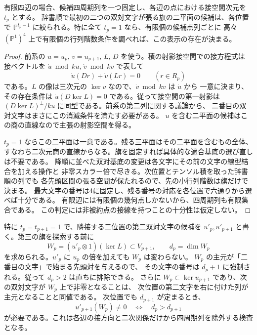 \begin{corollary}\label{cor:pbw-tangent-flags}
有限四辺の場合、候補四周期列を一つ固定し、各辺の点における接空間次元を $t_p$ とする。
辞書順で最初の二つの双対文字が張る旗の二平面の候補は、各位置で
$\mathbb P^{t_p-1}$ に絞られる。特に全て $t_p=1$ なら、有限個の候補点列ごとに
高々 $(\mathbb P^1)^4$ 上で有限個の行列階数条件を調べれば、この表示の存在が決まる。
\end{corollary}
\begin{proof}
前系の $u=u_p$, $v=u_{p+1}$, $L$, $D$ を使う。積の射影接空間での接方程式は
接ベクトルを $\dot u\bmod ku$, $\dot v\bmod kv$ で表して
\[
             \dot u(D r)+\dot v(L r)=0\qquad(r\in R_p)
\]
である。$L$ の像は三次元の $\ker v$ なので、$\dot v\bmod kv$ は $\dot u$ から
一意に決まり、その存在条件は $\dot u(D\ker L)=0$ である。従って接空間の第一射影は
$(D\ker L)^\perp/ku$ に同型である。前系の第二列に関する議論から、
二番目の双対文字はまさにこの消滅条件を満たす必要がある。
$u$ を含む二平面の候補はこの商の直線なので主張の射影空間を得る。

$t_p=1$ ならこの二平面は一意である。残る三平面はその二平面を含むもの全体、
すなわち二次元商の直線からなる。旗を固定すれば具体的な適合基底の選び直しは不要である。
降順に並べた双対基底の変更は各文字にその前の文字の線型結合を加える操作と
非零スカラー倍で尽きる。次位置とテンソル積を取った辞書順の列でも
各先頭区間の張る空間が保たれるので、先の小行列階数は旗だけで決まる。
最大文字の番号は4に固定し、残る番号の対応を各位置で六通りから選べば十分である。
有限辺には有限個の幾何点しかないから、四周期列も有限集合である。
この判定には非被約点の接線を持つことの十分性は仮定しない。
\end{proof}

特に $t_p=t_{p+1}=1$ で、隣接する二位置の第二双対文字の候補を
$u'_p,u'_{p+1}$ と書く。第三の旗を探索する前に
\[
 W_p=(u'_p\otimes1)(\ker L)\subset V_{p+1},\qquad d_p=\dim W_p
\]
を求められる。$u'_p$ に $u_p$ の倍を加えても $W_p$ は変わらない。
$W_p$ の主元が「二番目の文字」で始まる先頭対を与えるので、
その文字の番号は $d_p+1$ に強制される。従って $d_p>2$ は直ちに排除できる。
さらに $W_p\subset\ker u_{p+1}$ であり、次の双対文字が $W_p$ 上で非零となることは、
次位置の第二文字を右に付けた列が主元となることと同値である。
次位置でも $d_{p+1}$ が定まるとき、
\[
         u'_{p+1}(W_p)\ne0 \quad\Longleftrightarrow\quad d_p>d_{p+1}
\]
が必要である。これは各辺の接方向と二次関係だけから四周期列を除外する検査となる。

